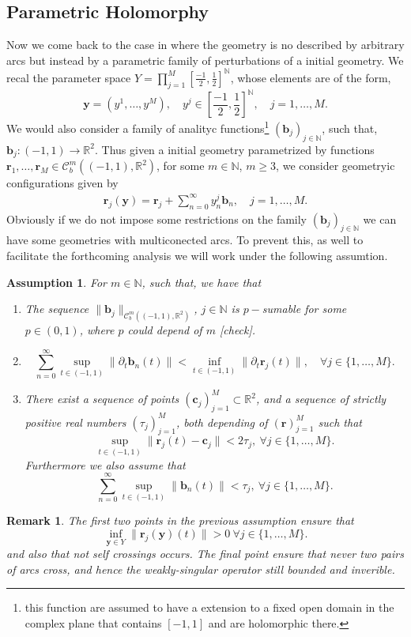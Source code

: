 \documentclass{article}
\newtheorem{remark}[theorem]{Remark}
\newtheorem{assumption}[theorem]{Assumption}
\newcommand{\todo}[1]{{\color{red}[#1]}}
\newcommand{\IN}{{\mathbb N}}
\newcommand{\IR}{{\mathbb R}}
\newcommand{\rgeo}[1]{\mathcal{C}_b^{#1}\left( (-1,1), \IR^2 \right)}
\newcommand{\bc}{\bm{c}}
\newcommand{\br}{\bm{r}}
\newcommand{\by}{\bm{y}}
\newcommand{\bb}{\bm{b}}
\begin{document}
\subsection{Parametric Holomorphy}
Now we come back to the case in where the geometry is no described by arbitrary arcs but instead by a parametric family of perturbations of a initial geometry. We recal the parameter space $Y = \prod_{j=1}^M \left[\frac{-1}{2} ,\frac{1}{2} \right]^{\IN}$, whose elements are of the form,
$$
\mathbf{y} = (y^1,\hdots,y^M), \quad y^j \in \left[\frac{-1}{2} ,\frac{1}{2} \right]^{\IN}, \quad j =1,\hdots,M.
$$
We would also consider a family of analityc functions\footnote{this function are assumed to have a extension to a fixed open domain in the complex plane that contains $[-1,1]$ and are holomorphic there.} $(\bb_j)_{j\in \IN}$, such that, $\bb_j :(-1,1) \rightarrow \IR^2$. Thus given a initial geometry parametrized by functions $\br_1,\hdots,\br_M \in \rgeo{m}$, for some $m\in \IN$, $m\geq 3$, we consider geometryic configurations given by 
\begin{align*}
\br_j(\by) = \br_j + \sum_{n=0}^\infty y^j_n \bb_n, \quad j=1,\hdots,M.
\end{align*}
Obviously if we do not impose some restrictions on the family $(\bb_j)_{j\in\IN}$ we can have some geometries with multiconected arcs. To prevent this, as well to facilitate the forthcoming analysis we will work under the following assumtion.
\begin{assumption}
\label{assump:geoparam}
For $m \in \IN$, such that, we have that 
\begin{enumerate}
\item 
The sequence $\|\bb_j\|_{\rgeo{m}}$, $j\in \IN$ is $p-$sumable for some $p \in (0,1)$, where $p$ could depend of $m$ \todo{check}.
\item 
$$\sum_{n=0}^\infty \sup_{t \in (-1,1)} \| \partial_t \bb_n(t)\| < \inf_{t \in (-1,1)}\|\partial_t\br_j(t)\|,\quad \forall
j \in \{1,\hdots,M\}.
$$
\item
There exist a sequence of points $(\bc_j)_{j=1}^M \subset \IR^2$, and a sequence of strictly positive real numbers $(\tau_j)_{j=1}^M $, both depending of $(\br)_{j=1}^M$ such that 
$$\sup_{t\in(-1,1)} \| \br_j(t) - \bc_j \| < 2\tau_j,\ \forall j \in \{1,\hdots,M\}.$$
Furthermore we also assume that 
$$
\sum_{n=0}^\infty \sup_{t \in (-1,1)} \| \bb_n(t)\| <  \tau_j,\ \forall j \in \{1,\hdots,M\}.
$$
\end{enumerate}
\end{assumption}
\begin{remark}
The first two points in the previous assumption ensure that 
$$
\inf_{\by \in Y} \|\br_j(\by)(t) \| > 0 \ \forall j \in \{1,\hdots,M\}.
$$
and also that not self crossings occurs. The final point ensure that never two pairs of arcs cross, and hence the weakly-singular operator still bounded and inverible. 
\end{remark}
\end{document}

